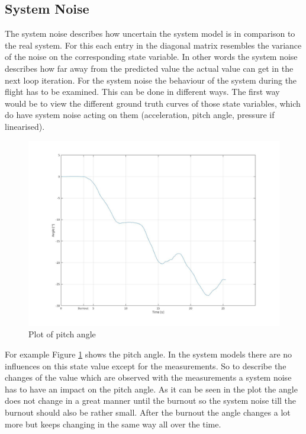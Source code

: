 \subsection{System Noise}
The system noise describes how uncertain the system model is in comparison to the real system.
For this each entry in the diagonal matrix resembles the variance of the noise on the corresponding state variable.
In other words the system noise describes how far away from the predicted value the actual value can get in the next loop iteration.
For the system noise the behaviour of the system during the flight has to be examined.
This can be done in different ways.
The first way would be to view the different ground truth curves of those state variables,
which do have system noise acting on them (acceleration, pitch angle, pressure if linearised).
\begin{figure}[h]
 \centering
 \includegraphics[width=.8\textwidth]{./Pictures/PitchAnglePlot.jpg}
 \caption{Plot of pitch angle}
 \label{fig:PitchAnglePlot}
\end{figure}
For example Figure \ref{fig:PitchAnglePlot} shows the pitch angle.
In the system models there are no influences on this state value except for the measurements.
So to describe the changes of the value which are observed with the measurements a system noise has to have an impact on the pitch angle.
As it can be seen in the plot the angle does not change in a great manner until the burnout so the system noise till the burnout should also be rather small.
After the burnout the angle changes a lot more but keeps changing in the same way all over the time. \\

